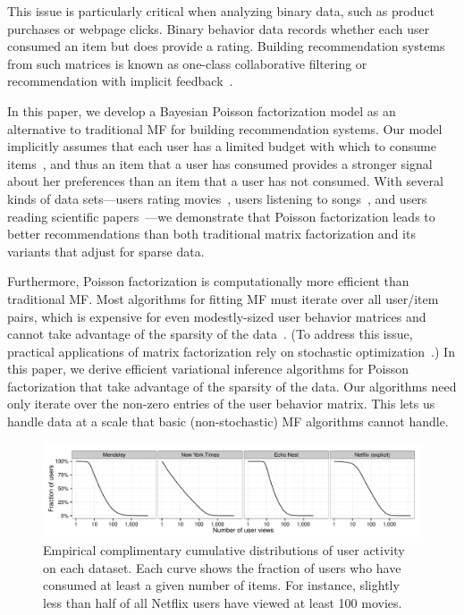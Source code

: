 \documentclass{sig-alternate}
\begin{document}
This issue is particularly critical when analyzing binary data, such
as product purchases or webpage clicks.  Binary behavior data records
whether each user consumed an item but does provide a rating.
Building recommendation systems from such matrices is known as
one-class collaborative filtering or recommendation with implicit
feedback~\cite{Hu:2008p9402,Paquet:2013p9197}.

In this paper, we develop a Bayesian Poisson factorization model as an
alternative to traditional MF for building recommendation systems.
Our model implicitly assumes that each user has a limited budget with
which to consume items~\cite{Goodhardt:1984}, and thus an item that a
user has consumed provides a stronger signal about her preferences
than an item that a user has not consumed.  With several kinds of data
sets---users rating movies~\cite{Herlocker:1999,Koren:2009}, users
listening to songs~\cite{Bertin-Mahieux:2011}, and users reading
scientific papers~\cite{Jack:2010}---we demonstrate that Poisson
factorization leads to better recommendations than both traditional
matrix factorization and its variants that adjust for sparse data.

Furthermore, Poisson factorization is computationally more efficient
than traditional MF.  Most algorithms for fitting MF must iterate over
all user/item pairs, which is expensive for even modestly-sized user
behavior matrices and cannot take advantage of the sparsity of the
data~\cite{Hu:2008p9402}.  (To address this issue, practical applications of matrix
factorization rely on stochastic optimization~\cite{Mairal:2010}.)  In
this paper, we derive efficient variational inference algorithms for
Poisson factorization that take advantage of the sparsity of the
data. Our algorithms need only iterate over the non-zero entries of
the user behavior matrix.  This lets us handle data at a scale that
basic (non-stochastic) MF algorithms cannot handle.



\begin{figure}[t!]
\includegraphics[width=\textwidth]{figures/user_activity_cdf.pdf}
\caption{Empirical complimentary cumulative distributions of user activity on each dataset. Each curve shows the fraction of users who have consumed at least a given number of items. For instance, slightly less than half of all Netflix users have viewed at least 100 movies.}
\label{fig:marginals}
\end{figure}
\end{document}
